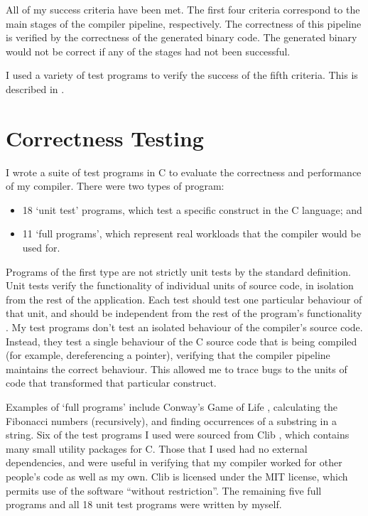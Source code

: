 \documentclass[00-main.tex]{subfiles}
\begin{document}
All of my success criteria have been met.
The first four criteria correspond to the main stages of the compiler pipeline, respectively.
The correctness of this pipeline is verified by the correctness of the generated binary code.
The generated binary would not be correct if any of the stages had not been successful.

I used a variety of test programs to verify the success of the fifth criteria. This is described in .


\section{Correctness Testing} \label{sec:eval:correctness testing}

I wrote a suite of test programs in C to evaluate the correctness and performance of my compiler.
There were two types of program:
\begin{itemize}
\item 18 `unit test' programs, which test a specific construct in the C language; and
\item 11 `full programs', which represent real workloads that the compiler would be used for.
\end{itemize}

Programs of the first type are not strictly unit tests by the standard definition.
Unit tests verify the functionality of individual units of source code, in isolation from the rest of the application.
Each test should test one particular behaviour of that unit, and should be independent from the rest of the program's functionality \cite{unit-testing}.
My test programs don't test an isolated behaviour of the compiler's source code.
Instead, they test a single behaviour of the C source code that is being compiled (for example, dereferencing a pointer), verifying that the compiler pipeline maintains the correct behaviour.
This allowed me to trace bugs to the units of code that transformed that particular construct.

Examples of `full programs' include Conway's Game of Life \cite{conways-game-of-life}, calculating the Fibonacci numbers (recursively), and finding occurrences of a substring in a string.
Six of the test programs I used were sourced from Clib \cite{clib}, which contains many small utility packages for C. Those that I used had no external dependencies, and were useful in verifying that my compiler worked for other people's code as well as my own. Clib is licensed under the MIT license, which permits use of the software ``without restriction''.
The remaining five full programs and all 18 unit test programs were written by myself.
\end{document}
